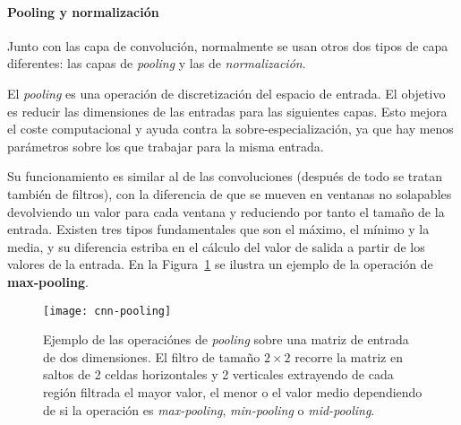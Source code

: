 \paragraph{Pooling y normalización}

Junto con las capa de convolución, normalmente se usan otros dos tipos de capa diferentes: las capas de \textit{pooling} y las de \textit{normalización}.

El \textit{pooling} es una operación de discretización del espacio de entrada. El objetivo es reducir las dimensiones de las entradas para las siguientes capas. Esto mejora el coste computacional y ayuda contra la sobre-especialización, ya que hay menos parámetros sobre los que trabajar para la misma entrada.

Su funcionamiento es similar al de las convoluciones (después de todo se tratan también de filtros), con la diferencia de que se mueven en ventanas no solapables devolviendo un valor para cada ventana y reduciendo por tanto el tamaño de la entrada. Existen tres tipos fundamentales que son el máximo, el mínimo y la media, y su diferencia estriba en el cálculo del valor de salida a partir de los valores de la entrada. En la Figura~\ref{fig:cnn-max-pooling} se ilustra un ejemplo de la operación de \textbf{max-pooling}.

\begin{figure}[t]
	\centering
	\texttt{[image: cnn-pooling]}
	\caption[Ejemplo de las operaciónes de \textit{pooling}.]{Ejemplo de las operaciónes de \textit{pooling} sobre una matriz de entrada de dos dimensiones. El filtro de tamaño $2 \times 2$ recorre la matriz en saltos de 2 celdas horizontales y 2 verticales extrayendo de cada región filtrada el mayor valor, el menor o el valor medio dependiendo de si la operación es \textit{max-pooling}, \textit{min-pooling} o \textit{mid-pooling}.}
	\label{fig:cnn-max-pooling}
\end{figure}

